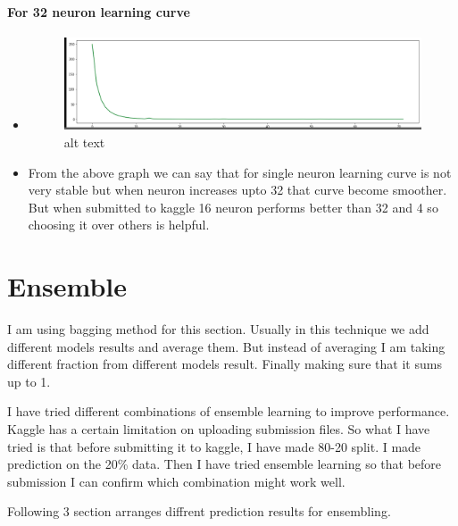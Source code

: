 \documentclass[11pt, a4paper , landscape]{article}
\makeatletter
\def\maxwidth{\ifdim\Gin@nat@width>\linewidth\linewidth
    \else\Gin@nat@width\fi}
\let\Oldincludegraphics\includegraphics
\renewcommand{\includegraphics}[1]{\Oldincludegraphics[width=.8\maxwidth]{#1}}
\makeatother
\begin{document}
\paragraph{For 32 neuron learning
curve}\label{for-32-neuron-learning-curve}

\begin{itemize}
\item
  \begin{figure}
  \centering
  \includegraphics{img/32.png}
  \caption{alt text}
  \end{figure}
\item
  From the above graph we can say that for single neuron learning curve
  is not very stable but when neuron increases upto 32 that curve become
  smoother. But when submitted to kaggle 16 neuron performs better than
  32 and 4 so choosing it over others is helpful.
\end{itemize}

 

    \section{Ensemble}\label{ensemble}

I am using bagging method for this section. Usually in this technique we
add different models results and average them. But instead of averaging
I am taking different fraction from different models result. Finally
making sure that it sums up to 1.

    I have tried different combinations of ensemble learning to improve
performance. Kaggle has a certain limitation on uploading submission
files. So what I have tried is that before submitting it to kaggle, I
have made 80-20 split. I made prediction on the 20\% data. Then I have
tried ensemble learning so that before submission I can confirm which
combination might work well.

    Following 3 section arranges diffrent prediction results for ensembling.
\end{document}

